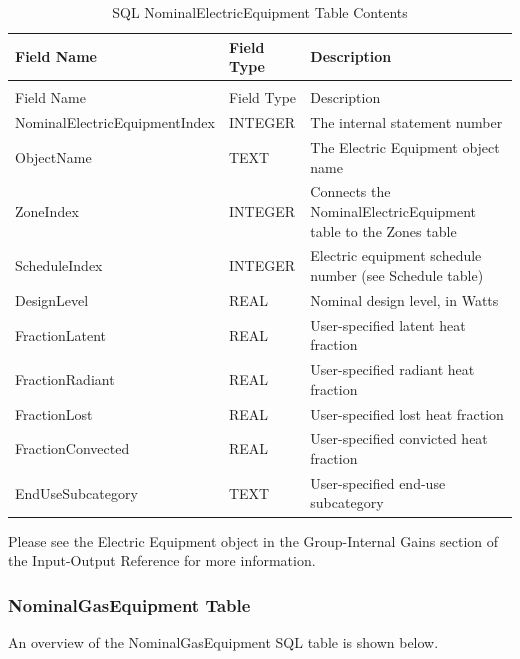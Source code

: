{\scriptsize
\begin{longtable}[c]{>{\raggedright}p{1.5in}>{\raggedright}p{1.5in}>{\raggedright}p{2.99in}}
\caption{SQL NominalElectricEquipment Table Contents \label{table:table-17.-sql-nominalelectricequipment-table}} \tabularnewline
\toprule
Field Name & Field Type & Description \tabularnewline
\midrule
\endfirsthead

\caption[]{SQL NominalElectricEquipment Table Contents} \tabularnewline
\toprule
Field Name & Field Type & Description \tabularnewline
\midrule
\endhead

Nominal\-Electric\-Equipment\-Index & INTEGER & The internal statement number \tabularnewline
ObjectName & TEXT & The Electric Equipment object name \tabularnewline
ZoneIndex & INTEGER & Connects the NominalElectricEquipment table to the Zones table \tabularnewline
ScheduleIndex & INTEGER & Electric equipment schedule number (see Schedule table) \tabularnewline
DesignLevel & REAL & Nominal design level, in Watts \tabularnewline
FractionLatent & REAL & User-specified latent heat fraction \tabularnewline
FractionRadiant & REAL & User-specified radiant heat fraction \tabularnewline
FractionLost & REAL & User-specified lost heat fraction \tabularnewline
FractionConvected & REAL & User-specified convicted heat fraction \tabularnewline
EndUseSubcategory & TEXT & User-specified end-use subcategory \tabularnewline
\bottomrule
\end{longtable}}

Please see the Electric Equipment object in the Group-Internal Gains section of the Input-Output Reference for more information.

\subsubsection{NominalGasEquipment Table}

An overview of the NominalGasEquipment SQL table is shown below.

